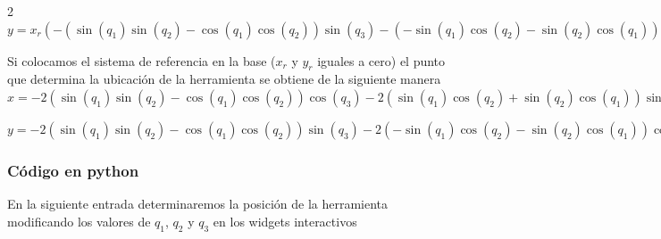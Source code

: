 \documentclass[twoside]{article}
\begin{document}
\begin{multicols}{2}
\vspace*{1\baselineskip}
$y = x_{r} (- (\sin{ (q_{1}  )} \sin{ (q_{2}  )} - \cos{ (q_{1}  )} \cos{ (q_{2}  )}) \sin{ (q_{3}  )} - (- \sin{ (q_{1}  )} \cos{ (q_{2}  )} - \sin{ (q_{2}  )} \cos{ (q_{1}  )}) \cos{ (q_{3}  )}) + y_{r} (- (\sin{ (q_{1}  )} \sin{ (q_{2}  )} - \cos{ (q_{1}  )} \cos{ (q_{2}  )}) \cos{ (q_{3}  )} + (- \sin{ (q_{1}  )} \cos{ (q_{2}  )} - \sin{ (q_{2}  )} \cos{ (q_{1}  )}) \sin{ (q_{3}  )}) - 2 (\sin{ (q_{1}  )} \sin{ (q_{2}  )} - \cos{ (q_{1}  )} \cos{ (q_{2}  )}) \sin{ (q_{3}  )} - 2 (- \sin{ (q_{1}  )} \cos{ (q_{2}  )} - \sin{ (q_{2}  )} \cos{ (q_{1}  )}) \cos{ (q_{3}  )} - 3 \sin{ (q_{1}  )} \cos{ (q_{2}  )} + 4 \sin{ (q_{1}  )} - 3 \sin{ (q_{2}  )} \cos{ (q_{1}  )}$
\vspace*{1\baselineskip}

Si colocamos el sistema de referencia en la base ($x_r$ y $y_r$ iguales a cero) el punto que determina la ubicación de la
herramienta se obtiene de la siguiente manera \\
$x=- 2 (\sin{ (q_{1}  )} \sin{ (q_{2}  )} - \cos{ (q_{1}  )} \cos{ (q_{2}  )}) \cos{ (q_{3}  )} - 2 (\sin{ (q_{1}  )} \cos{ (q_{2}  )} + \sin{ (q_{2}  )} \cos{ (q_{1}  )}) \sin{ (q_{3}  )} + 3 \sin{ (q_{1}  )} \sin{ (q_{2}  )} - 3 \cos{ (q_{1}  )} \cos{ (q_{2}  )} + 4 \cos{ (q_{1}  )}$

\vspace*{1\baselineskip}
$y=- 2 (\sin{ (q_{1}  )} \sin{ (q_{2}  )} - \cos{ (q_{1}  )} \cos{ (q_{2}  )}) \sin{ (q_{3}  )} - 2 (- \sin{ (q_{1}  )} \cos{ (q_{2}  )} - \sin{ (q_{2}  )} \cos{ (q_{1}  )}) \cos{ (q_{3}  )} - 3 \sin{ (q_{1}  )} \cos{ (q_{2}  )} + 4 \sin{ (q_{1}  )} - 3 \sin{ (q_{2}  )} \cos{ (q_{1}  )}$

\end{multicols}
\subsubsection{Código en python}
En la siguiente entrada determinaremos la posición de la herramienta modificando los valores de 
$q_1$, $q_2$ y $q_3$ en los widgets interactivos
\end{document}

